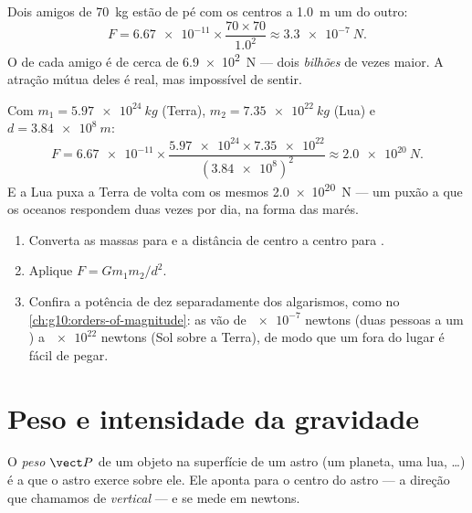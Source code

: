 \begin{example}\label{ex:g10:universal-gravitation:friends}
Dois amigos de \qty{70}{kg} estão de pé com os centros a \qty{1.0}{m} um
do outro:
\[
F = \num{6.67e-11} \times \frac{70 \times 70}{1.0^2}
\approx \qty{3.3e-7}{N}.
\]
O  de cada amigo é de cerca de \qty{6.9e2}{N} --- dois \emph{bilhões}
de vezes maior. A atração mútua deles é real, mas impossível de sentir.
\end{example}

\begin{example}\label{ex:g10:universal-gravitation:earthmoon}
Com $m_1 = \qty{5.97e24}{kg}$ (Terra), $m_2 = \qty{7.35e22}{kg}$ (Lua) e
$d = \qty{3.84e8}{m}$:
\[
F = \num{6.67e-11} \times
\frac{\num{5.97e24} \times \num{7.35e22}}{(\num{3.84e8})^2}
\approx \qty{2.0e20}{N}.
\]
E a Lua puxa a Terra de volta com os mesmos \qty{2.0e20}{N} --- um puxão
a que os oceanos respondem duas vezes por dia, na forma das marés.
\end{example}

\begin{method}\label{met:g10:universal-gravitation:compute}
\begin{enumerate}
  \item Converta as massas para  e a distância de centro a
        centro para .
  \item Aplique $F = G m_1 m_2 / d^2$.
  \item Confira a potência de dez separadamente dos algarismos, como no
        \cref{ch:g10:orders-of-magnitude}: as  vão
        de $\num{e-7}$ newtons (duas pessoas a um ) a $\num{e22}$
        newtons (Sol sobre a Terra), de modo que um  fora do
        lugar é fácil de pegar.
\end{enumerate}
\end{method}

\section{Peso e intensidade da gravidade}

\begin{definition}[Peso]\label{def:g10:universal-gravitation:weight}
O \emph{peso} $\vect P$ de um objeto na superfície de um
astro (um planeta, uma lua, \dots) é a  que o astro
exerce sobre ele. Ele aponta para o centro do astro --- a direção que
chamamos de \emph{vertical} --- e se mede em newtons.
\end{definition}

